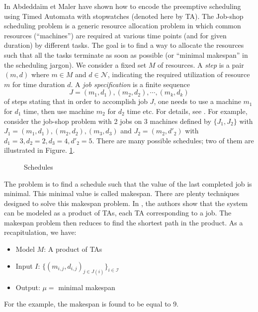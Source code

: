 \documentclass{article}
\begin{document}
In \cite{am02} Abdedda\"{i}m et Maler have shown how to encode the preemptive scheduling using Timed Automata with stopwatches (denoted here by TA). The Job-shop scheduling problem is a generic 
resource allocation problem in which common
resources (``machines'') are required at various time points (and for given duration) by different tasks. The goal is to find a way to allocate the resources such that all the tasks terminate
as soon as possible (or ``minimal makespan'' in the scheduling jargon). We consider a fixed set $M$ of resources. A \emph{step} is a pair $(m,d)$ where $m \in M$ and $d \in \mathcal{N}$, indicating 
the required utilization of resource $m$ for time duration $d$. A \emph{job specification} is a finite sequence
$$J = (m_1,d_1),(m_2,d_2),\cdots, (m_k,d_k)$$ of steps stating that in order to accomplish job $J$, one needs to use a machine $m_1$ for $d_1$ time, then use machine $m_2$ for $d_2$ time etc.
For details, see \cite{am02}.
For example, consider the job-shop problem with 2 jobs on 3 machines defined by $\{J_1, J_2\}$ with $J_1 = (m_1,d_1), (m_2,d_2),(m_3,d_3)$ and $J_2 = (m_2,d'_2)$ with $d_1 = 3, d_2=2, d_3=4, d'_2 = 5$.
There are many possible schedules; two of them are illustrated in Figure. \ref{fig:schedules_maler}.
\begin{figure}[!ht]
 \label{fig:schedules_maler}
 \caption{Schedules}
\end{figure}
The problem is to find a schedule such that the value of the last completed job is minimal. This minimal value is called makespan. There are plenty techniques designed to solve this makespan problem. In 
\cite{am02}, the authors show that the system can be modeled as a product of TAs, each TA corresponding to a job. The makespan problem then reduces to find the shortest path in the product.
As a recapitulation, we have:
\begin{itemize}
 \item Model $M$: A product of TAs
 \item Input $I$:  $\{(m_{i,j},d_{i,j})_{j\in J(i)}\}_{i \in \mathcal{I}}$
 \item Output: $\mu =$ minimal makespan
\end{itemize}

For the example, the makespan is found to be equal to 9.

\end{document}
